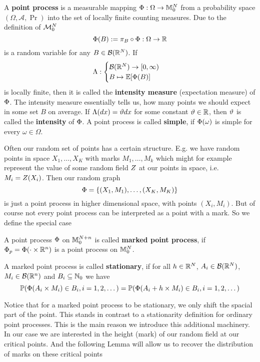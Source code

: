 \begin{definition}
	A \textbf{point process} is a measurable mapping \(\pp:\Omega\to\locFiniteMeasure\)
	from a probability space \((\Omega, \mathcal{A}, \Pr)\) into the set of
	locally finite counting measures. Due to the definition of \(\locFiniteMeasAlg\)
	\[
		\pp(B) := \pi_B\circ \pp : \Omega \to \real
	\]
	is a random variable for any \(B\in\borel(\real^\dims)\). If
	\[
		\intensityMeas:\begin{cases}
			\borel(\real^\dims)\to [0,\infty)\\
			B \mapsto \E[\pp(B)]
		\end{cases}
	\]
	is locally finite, then it is called the \textbf{intensity measure}
	(expectation measure) of \(\pp\). The intensity measure essentially tells
	us, how many points we should expect in some set \(B\) on average.
	If \(\intensityMeas(dx) = \intensity dx\) for some
	constant \(\intensity\in\real\), then \(\intensity\) is called the
	\textbf{intensity} of \(\pp\).
	A point process is called \textbf{simple}, if \(\pp(\omega)\) is simple
	for every \(\omega\in\Omega\).
\end{definition}

Often our random set of points has a certain structure. E.g. we have
random points in space \(X_1,\dots, X_K\) with marks \(M_1,\dots, M_k\) which
might for example represent the value of some random field \(\rf\) at our
points in space, i.e. \(M_i=\rf(X_i)\). Then our random graph 
\[
	\pp = \{ (X_1, M_1), \dots, (X_K, M_K) \}
\]
is just a point process in higher dimensional space, with points \((X_i, M_i)\).
But of course not every point process can be interpreted as a point with a mark.
So we define the special case

\begin{definition}
	A point process \(\pp\) on \(\locFiniteMeasure[\dims+n]\) is called
	\textbf{marked point process}, if \(\pp_p = \pp(\cdot \times \real^n)\)
	is a point process on \(\locFiniteMeasure\).

	A marked point process is called \textbf{stationary}, if for all
	\(h\in\real^\dims\), \(A_i\in\borel(\real^\dims)\),
	\(M_i\in\borel(\real^n)\) and \(B_i\subseteq\nat_0\) we have
	\[
		\Pr(\pp(A_i\times M_i) \in B_i, i=1,2,\dots)
		= \Pr(\pp(A_i+h \times M_i)\in B_i, i=1,2,\dots)
	\]
\end{definition}

Notice that for a marked point process to be stationary, we only shift the
spacial part of the point. This stands in contrast to a stationarity definition
for ordinary point processes. This is the main reason we introduce this
additional machinery. In our case we are interested in the height (mark) of
our random field at our critical points. And the following Lemma will allow us
to recover the distribution of marks on these critical points

